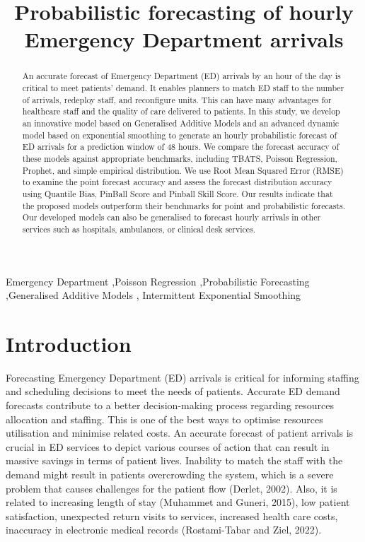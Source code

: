 \documentclass[]{elsarticle} %
\begin{document}
\begin{frontmatter}

  \title{Probabilistic forecasting of hourly Emergency Department arrivals}
  
  \begin{abstract}
  An accurate forecast of Emergency Department (ED) arrivals by an hour of the day is critical to meet patients' demand. It enables planners to match ED staff to the number of arrivals, redeploy staff, and reconfigure units. This can have many advantages for healthcare staff and the quality of care delivered to patients. In this study, we develop an innovative model based on Generalised Additive Models and an advanced dynamic model based on exponential smoothing to generate an hourly probabilistic forecast of ED arrivals for a prediction window of 48 hours. We compare the forecast accuracy of these models against appropriate benchmarks, including TBATS, Poisson Regression, Prophet, and simple empirical distribution. We use Root Mean Squared Error (RMSE) to examine the point forecast accuracy and assess the forecast distribution accuracy using Quantile Bias, PinBall Score and Pinball Skill Score. Our results indicate that the proposed models outperform their benchmarks for point and probabilistic forecasts. Our developed models can also be generalised to forecast hourly arrivals in other services such as hospitals, ambulances, or clinical desk services.
  \end{abstract}
    \begin{keyword}
    Emergency Department \sep Poisson Regression \sep Probabilistic Forecasting \sep Generalised Additive Models \sep 
    Intermittent Exponential Smoothing
  \end{keyword}
  
 \end{frontmatter}

\hypertarget{introduction}{%
\section{Introduction}\label{introduction}}

Forecasting Emergency Department (ED) arrivals is critical for informing
staffing and scheduling decisions to meet the needs of patients.
Accurate ED demand forecasts contribute to a better decision-making
process regarding resources allocation and staffing. This is one of the
best ways to optimise resources utilisation and minimise related costs.
An accurate forecast of patient arrivals is crucial in ED services to
depict various courses of action that can result in massive savings in
terms of patient lives. Inability to match the staff with the demand
might result in patients overcrowding the system, which is a severe
problem that causes challenges for the patient flow
(Derlet, 2002). Also, it is related to increasing length of
stay (Muhammet and Guneri, 2015), low patient satisfaction, unexpected
return visits to services, increased health care costs, inaccuracy in
electronic medical records (Rostami-Tabar and Ziel, 2022).
\end{document}
